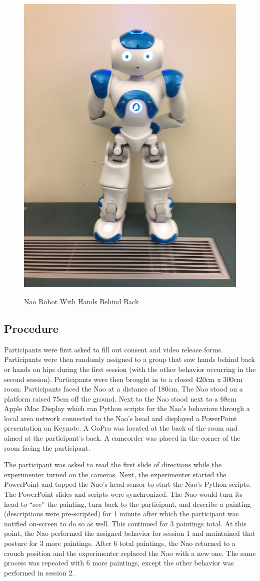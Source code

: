 \documentclass{acm_proc_article-sp}
\begin{document}
\begin{figure}[t!]
\centering
 \includegraphics[width=0.65\linewidth]{images/behind3.jpg}\\
 \caption{Nao Robot With Hands Behind Back}
 \label{f:bert} %
\end{figure}

\subsection{Procedure}
Participants were first asked to fill out consent and video release forms. Participants were then randomly assigned to a group that saw hands behind back or hands on hips during the first session (with the other behavior occurring in the second session). Participants were then brought in to a closed 420cm x 300cm room. Participants faced the Nao at a distance of 180cm. The Nao stood on a platform raised 75cm off the ground. Next to the Nao stood next to a 68cm Apple iMac Display which ran Python scripts for the Nao's behaviors through a local area network connected to the Nao's head and displayed a PowerPoint presentation on Keynote. A GoPro was located at the back of the room and aimed at the participant's back. A camcorder was placed in the corner of the room facing the participant.

The participant was asked to read the first slide of directions while the experimenter turned on the cameras. Next, the experimenter started the PowerPoint and tapped the Nao's head sensor to start the Nao's Python scripts. The PowerPoint slides and scripts were synchronized. The Nao would turn its head to ``see'' the painting, turn back to the participant, and describe a painting (descriptions were pre-scripted) for 1 minute after which the participant was notified on-screen to do so as well. This continued for 3 paintings total. At this point, the Nao performed the assigned behavior for session 1 and maintained that posture for 3 more paintings. After 6 total paintings, the Nao returned to a crouch position and the experimenter replaced the Nao with a new one. The same process was repeated with 6 more paintings, except the other behavior was performed in session 2. 
\end{document}
